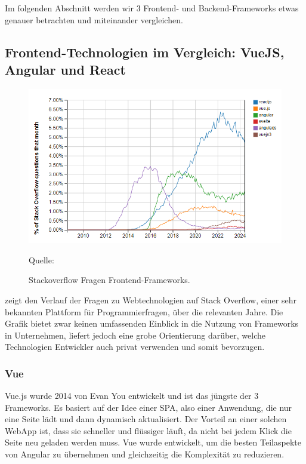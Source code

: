 \documentclass[biblatex]{lni}
\begin{document}
Im folgenden Abschnitt werden wir 3 Frontend- und Backend-Frameworks etwas genauer betrachten und miteinander vergleichen.

\subsection{Frontend-Technologien im Vergleich: VueJS, Angular und React}

\begin{figure}
  \centering
  \includegraphics[width=.8\textwidth]{fetrends}
  \caption{Stackoverflow Fragen Frontend-Frameworks.}
  \label{fig:fetrends}
  \vspace{-0.3cm}
  \begin{center}
    \footnotesize Quelle: \cite{SOTrend}
  \end{center}
\end{figure}

 zeigt den Verlauf der Fragen zu Webtechnologien auf Stack Overflow,
einer sehr bekannten Plattform für Programmierfragen, über die relevanten Jahre.
Die Grafik bietet zwar keinen umfassenden Einblick in die Nutzung von Frameworks in Unternehmen,
liefert jedoch eine grobe Orientierung darüber, welche Technologien Entwickler auch privat verwenden und somit bevorzugen.

\subsubsection{Vue}
Vue.js wurde 2014 von Evan You entwickelt und ist das jüngste der 3 Frameworks. \cite{AmD}
Es basiert auf der Idee einer \ac{SPA}, also einer Anwendung, die nur eine Seite lädt und dann dynamisch aktualisiert. \cite{BStack}
Der Vorteil an einer solchen WebApp ist, dass sie schneller und flüssiger läuft, da nicht bei jedem Klick die Seite neu geladen werden muss.
Vue wurde entwickelt, um die besten Teilaspekte von Angular zu übernehmen und gleichzeitig die Komplexität zu reduzieren.
\end{document}
